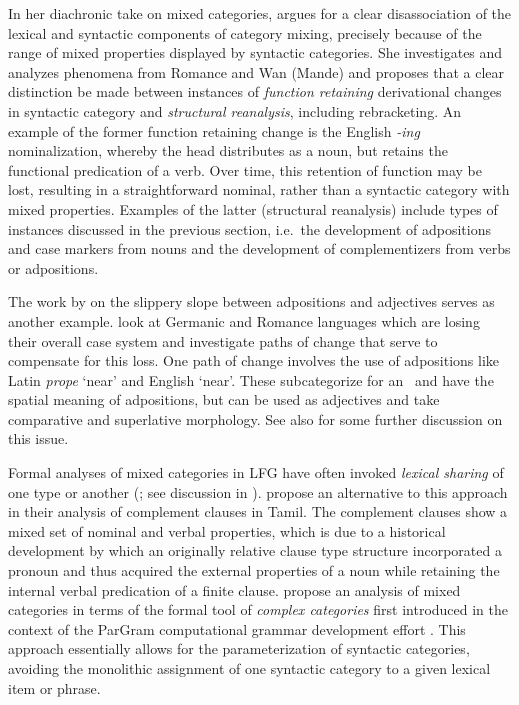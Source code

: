 \documentclass[output=paper,hidelinks]{langscibook}
\begin{document}
In her diachronic take on mixed categories,  \citet{Nikitina2008} argues for a clear disassociation of the lexical and syntactic components of category mixing, precisely because of the range of mixed properties displayed by syntactic categories. She investigates and analyzes  phenomena from Romance and Wan (Mande) and proposes that a clear distinction be made  between instances of \textit{function retaining} derivational changes in syntactic category and \textit{structural reanalysis}, including rebracketing. An example of the former function retaining change is the English \textit{-ing} nominalization, whereby the head distributes as a noun, but retains the functional predication of a verb. Over time, this retention of function may be lost, resulting in a straightforward nominal, rather than a syntactic category with mixed properties. 
Examples of the latter (structural reanalysis) include types of instances discussed in the previous section, i.e.~the development of adpositions and case markers from nouns and the development of complementizers from verbs \citep{lord93} or adpositions.  

The work by  \citet{VincBorj10a} on the slippery slope between adpositions and adjectives serves as another example. \citet{VincBorj10a} look at Germanic and Romance languages which are losing their overall case system and investigate paths of change that serve to compensate for this loss.  One path of change involves the use of adpositions like Latin \textit{prope} `near' and English `near'.   These subcategorize for an \OBJ\ and have the spatial meaning of adpositions, but can be used as adjectives and take comparative and superlative morphology. See also \citet{vincent2020heads} for some further discussion on this issue. 

Formal analyses of mixed categories in LFG have often invoked \textit{lexical sharing} of one type or another (\citet{BresMuga06,Lowe15,lowe2015clitic}; see discussion in ). \citet{brs:2020} propose an alternative to this approach in their analysis of complement clauses in Tamil.  The complement clauses show a mixed set of nominal and verbal properties, which is due to a historical development by which an originally relative clause type structure incorporated a pronoun and thus acquired the external properties of a noun while retaining the internal verbal predication of a finite clause.  \citet{brs:2020} propose an analysis of mixed categories in terms of the formal tool of \textit{complex categories} first introduced in the context of the ParGram computational grammar development effort \citep{ButtEtAl1999,xledoc}.  This approach essentially allows for the parameterization of syntactic categories, avoiding the monolithic assignment of one syntactic category to a given lexical item or phrase.
\end{document}
